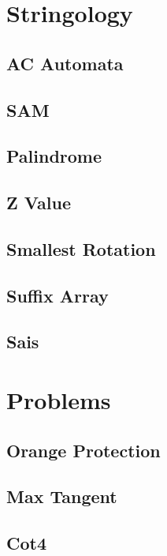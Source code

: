 \section{Stringology}
\subsection{AC Automata}

\subsection{SAM}

\subsection{Palindrome}

\subsection{Z Value}

\subsection{Smallest Rotation}

\subsection{Suffix Array}

\subsection{Sais}

\section{Problems}
\subsection{Orange Protection}

\subsection{Max Tangent}

\subsection{Cot4}

